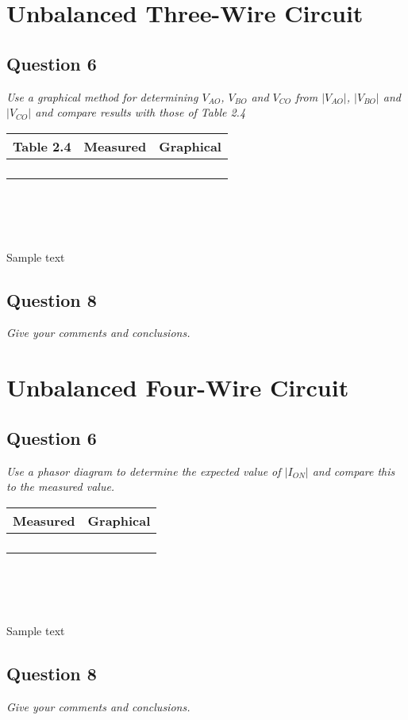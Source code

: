 \documentclass{article}
\begin{document}
\section{Unbalanced Three-Wire Circuit}
   \subsection{Question 6}
   \textit{Use a graphical method for determining $V_{AO}$, $V_{BO}$ and $V_{CO}$ from $|V_{AO}|$, $|V_{BO}|$ and $|V_{CO}|$ and compare results with those of Table 2.4} \\ 

   \begin{centering}
   \begin{tabular}{|c|c|c|} \hline
     Table 2.4 & Measured & Graphical \\ \hline
      & & \\ \hline
      & & \\ \hline
      & & \\ \hline
      & & \\ \hline
   \end{tabular} \\
   \end{centering}
   \noindent \\ \\
   Sample text
   \subsection{Question 8}
   \textit{Give your comments and conclusions.}
   \par

   \clearpage

\section{Unbalanced Four-Wire Circuit}
  \subsection{Question 6}
  \textit{Use a phasor diagram to determine the expected value of $|I_{ON}|$ and compare this to the measured value.}
  \par
  \begin{centering}
  \begin{tabular}{|c|c|} \hline
    Measured & Graphical \\ \hline
     & \\ \hline
     & \\ \hline
     & \\ \hline
     & \\ \hline
  \end{tabular} \\
  \end{centering}
  \noindent \\ \\
  Sample text

  
  \subsection{Question 8}
  \textit{Give your comments and conclusions.}
  \par
  
  \clearpage
\end{document}
